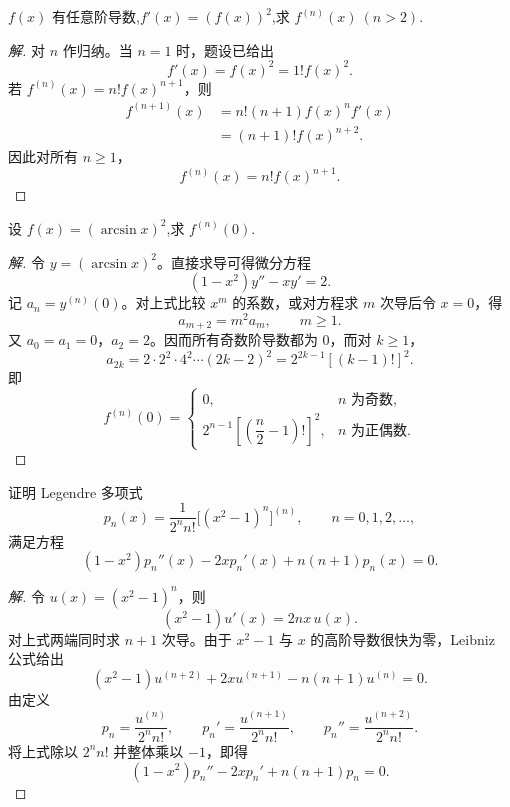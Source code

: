 \documentclass[../../数学分析培优讲义(答案版).tex]{subfiles}
\begin{document}
\begin{example}[\markstar]
$f(x)$ 有任意阶导数,$f'(x)=(f(x))^2$,求 $f^{(n)}(x)\ (n>2)$.
\end{example}

\begin{proof}[解]
对 $n$ 作归纳。当 $n=1$ 时，题设已给出
\[
    f'(x)=f(x)^2=1!f(x)^2.
\]
若 $f^{(n)}(x)=n!f(x)^{n+1}$，则
\[
\begin{aligned}
    f^{(n+1)}(x)
    &=n!(n+1)f(x)^n f'(x)\\
    &=(n+1)!f(x)^{n+2}.
\end{aligned}
\]
因此对所有 $n\geq1$，
\[
    f^{(n)}(x)=n!f(x)^{n+1}.
\]
\end{proof}


\begin{example}
设 $f(x)=(\arcsin x)^2$,求 $f^{(n)}(0)$.
\end{example}

\begin{proof}[解]
令 $y=(\arcsin x)^2$。直接求导可得微分方程
\[
    (1-x^2)y''-xy'=2.
\]
记 $a_n=y^{(n)}(0)$。对上式比较 $x^m$ 的系数，或对方程求 $m$ 次导后令 $x=0$，得
\[
    a_{m+2}=m^2a_m,
    \qquad m\geq1.
\]
又 $a_0=a_1=0$，$a_2=2$。因而所有奇数阶导数都为 $0$，而对 $k\geq1$，
\[
    a_{2k}=2\cdot2^2\cdot4^2\cdots(2k-2)^2
    =2^{2k-1}[(k-1)!]^2.
\]
即
\[
    f^{(n)}(0)=
    \begin{cases}
        0, & n\text{ 为奇数},\\
        2^{n-1}\left[\left(\dfrac{n}{2}-1\right)!\right]^2,
        & n\text{ 为正偶数}.
    \end{cases}
\]
\end{proof}

\begin{example}
证明 Legendre 多项式
\[
    p_n(x)=\dfrac{1}{2^n n!}\bigl[(x^2-1)^n\bigr]^{(n)},
    \qquad n=0,1,2,\ldots,
\]
满足方程
\[
    (1-x^2)p_n''(x)-2xp_n'(x)+n(n+1)p_n(x)=0.
\]
\end{example}

\begin{proof}[解]
令 $u(x)=(x^2-1)^n$，则
\[
    (x^2-1)u'(x)=2nx\,u(x).
\]
对上式两端同时求 $n+1$ 次导。由于 $x^2-1$ 与 $x$ 的高阶导数很快为零，Leibniz 公式给出
\[
    (x^2-1)u^{(n+2)}+2x u^{(n+1)}-n(n+1)u^{(n)}=0.
\]
由定义
\[
    p_n=\dfrac{u^{(n)}}{2^n n!},
    \qquad
    p_n'=\dfrac{u^{(n+1)}}{2^n n!},
    \qquad
    p_n''=\dfrac{u^{(n+2)}}{2^n n!}.
\]
将上式除以 $2^n n!$ 并整体乘以 $-1$，即得
\[
    (1-x^2)p_n''-2xp_n'+n(n+1)p_n=0.
\]
\end{proof}
\end{document}

